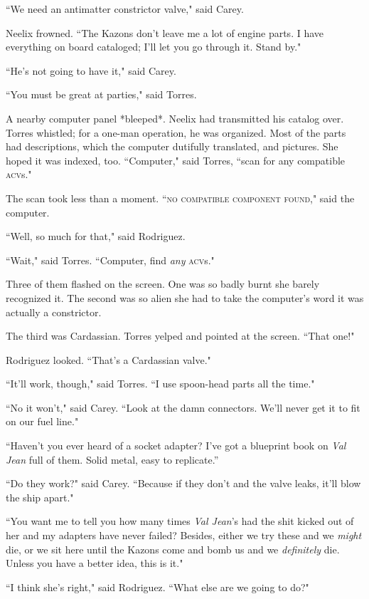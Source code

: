 \documentclass[twoside,letterpaper,12pt]{memoir}
\begin{document}
``We need an antimatter constrictor valve," said Carey.

Neelix frowned. ``The Kazons don't leave me a lot of engine parts. I have everything on board cataloged; I'll let you go through it. Stand by."

``He's not going to have it," said Carey.

``You must be great at parties," said Torres.

A nearby computer panel *bleeped*. Neelix had transmitted his catalog over. Torres whistled; for a one-man operation, he was organized. Most of the parts had descriptions, which the computer dutifully translated, and pictures. She hoped it was indexed, too. ``Computer," said Torres, ``scan for any compatible \textsc{acv}s."

The scan took less than a moment. ``\textsc{no compatible component found}," said the computer.

``Well, so much for that," said Rodriguez.

``Wait," said Torres. ``Computer, find \textit{any} \textsc{acv}s."

Three of them flashed on the screen. One was so badly burnt she barely recognized it. The second was so alien she had to take the computer's word it was actually a constrictor.

The third was Cardassian. Torres yelped and pointed at the screen. ``That one!"

Rodriguez looked. ``That's a Cardassian valve."

``It'll work, though," said Torres. ``I use spoon-head parts all the time."

``No it won't," said Carey. ``Look at the damn connectors. We'll never get it to fit on our fuel line."

``Haven’t you ever heard of a socket adapter? I’ve got a blueprint book on \textit{Val Jean }full of them. Solid metal, easy to replicate.”

``Do they work?" said Carey. ``Because if they don't and the valve leaks, it'll blow the ship apart."

``You want me to tell you how many times \textit{Val Jean}'s had the shit kicked out of her and my adapters have never failed? Besides, either we try these and we \textit{might} die, or we sit here until the Kazons come and bomb us and we \textit{definitely} die. Unless you have a better idea, this is it."

``I think she's right," said Rodriguez. ``What else are we going to do?"
\end{document}
